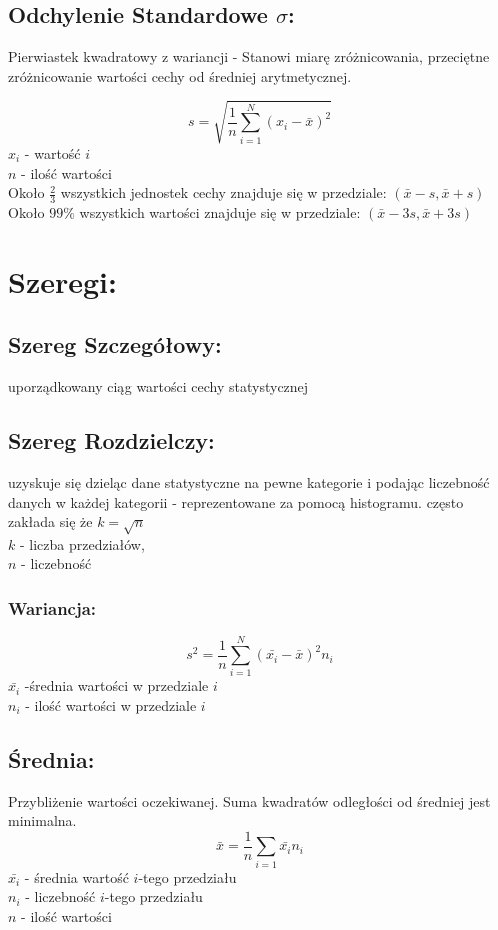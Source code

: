 \documentclass[fleqn,a4paper]{article}
\begin{document}
\subsection{Odchylenie Standardowe \texorpdfstring{\(\sigma\)}{s}:}
Pierwiastek kwadratowy z wariancji - Stanowi miarę zróżnicowania, przeciętne zróżnicowanie wartości cechy od średniej arytmetycznej.

\[s = \sqrt{\frac{1}{n}\sum_{i=1}^N(x_i-\bar{x})^2}\]
$x_i$ - wartość $i$\\
$n$ - ilość wartości \\
Około $\frac{2}{3}$ wszystkich jednostek cechy znajduje się w przedziale: $(\bar{x}-s,\bar{x}+s)$\\
Około $99\%$ wszystkich wartości znajduje się w przedziale:  $(\bar{x}-3s,\bar{x}+3s)$

\pagebreak

\section{Szeregi:}
\subsection{Szereg Szczegółowy:}
uporządkowany ciąg wartości cechy statystycznej

\subsection{Szereg Rozdzielczy:}
uzyskuje się dzieląc dane statystyczne na pewne kategorie i podając liczebność danych w każdej kategorii - reprezentowane za pomocą histogramu.
często zakłada się że $k=\sqrt{n}$\\ $k$ - liczba przedziałów,\\ $n$ - liczebność 
\subsubsection{Wariancja:}
\[s^2 = \frac{1}{n}\sum_{i=1}^N(\bar{x_i}-\bar{x})^2n_i\]
$\bar{x_i}$ -średnia wartości w przedziale $i$\\
$n_i$ - ilość wartości w przedziale $i$

\subsection{Średnia:}
Przybliżenie wartości oczekiwanej. Suma kwadratów odległości od średniej jest minimalna.
\[\bar{x} = \frac{1}{n}\sum_{i=1}\bar{x_i}n_i\]
$\bar{x_i}$ - średnia wartość $i$-tego przedziału\\
$n_i$ - liczebność $i$-tego przedziału\\
$n$ - ilość wartości
\end{document}
